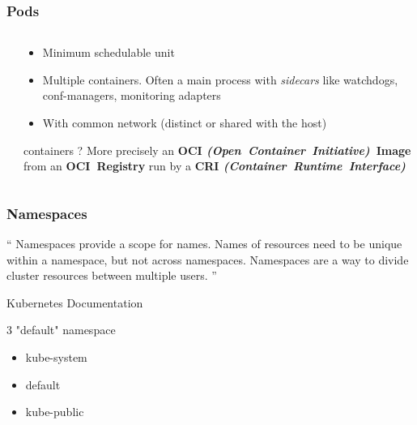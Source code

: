 \documentclass{beamer}
\begin{document}
\begin{frame}
  \frametitle{Pods}
  \begin{columns}
  \begin{column}{0.5\textwidth}
    \begin{center}
    \end{center}
  \end{column}
  \begin{column}{0.5\textwidth}
    \begin{itemize}
      \item<1-> Minimum schedulable unit
      \item<2-> Multiple containers. Often a main process with \textit{sidecars}
        like watchdogs, conf-managers, monitoring adapters
      \item<3-> With common network (distinct or shared with the host)
    \end{itemize}
    \begin{block}{containers ?}
        More precisely an {\bf OCI {\it (Open~Container~Initiative)}~Image} from an {\bf OCI~Registry}
        run by a {\bf CRI {\it (Container~Runtime~Interface)}}

    \end{block}
  \end{column}
  \end{columns}
\end{frame}

\begin{frame}
  \frametitle{Namespaces}
  \enquote{
    Namespaces provide a scope for names. Names of resources need to be unique within a namespace, but not across namespaces.
    \newline
    Namespaces are a way to divide cluster resources between multiple users.
  }
  \newline

  \hfill Kubernetes Documentation

  \vfill
  \scriptsize{
    \begin{block}{3 "default" namespace}
    \begin{itemize}
      \item kube-system
      \item default
      \item kube-public
    \end{itemize}
    \end{block}
  }
\end{frame}
\end{document}
